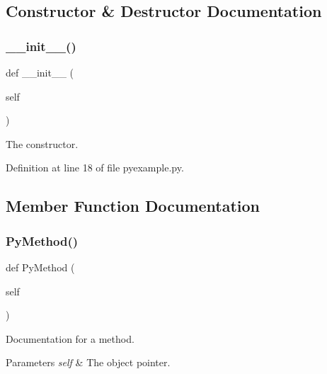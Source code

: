 \subsection{Constructor \& Destructor Documentation}
\mbox{\label{classpyexample_1_1_py_class_ae64f0875afe3067b97ba370b354b9213}} 
\subsubsection{\texorpdfstring{\+\_\+\+\_\+init\+\_\+\+\_\+()}{\_\_init\_\_()}}
{\footnotesize\ttfamily def \+\_\+\+\_\+init\+\_\+\+\_\+ (\begin{DoxyParamCaption}\item[{}]{self }\end{DoxyParamCaption})}



The constructor. 



Definition at line 18 of file pyexample.\+py.



\subsection{Member Function Documentation}
\mbox{\label{classpyexample_1_1_py_class_a06331a3bf023b9e7a180422e737b0381}} 
\subsubsection{\texorpdfstring{Py\+Method()}{PyMethod()}}
{\footnotesize\ttfamily def Py\+Method (\begin{DoxyParamCaption}\item[{}]{self }\end{DoxyParamCaption})}



Documentation for a method. 


\begin{DoxyParams}{Parameters}
{\em self} & The object pointer. \\
\hline
\end{DoxyParams}


